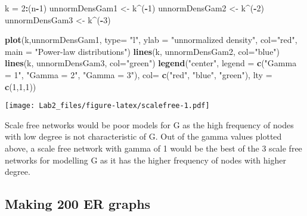 \documentclass[]{article}
\newenvironment{Shaded}{\begin{snugshade}}{\end{snugshade}}
\newcommand{\KeywordTok}[1]{\textcolor[rgb]{0.13,0.29,0.53}{\textbf{#1}}}
\newcommand{\DataTypeTok}[1]{\textcolor[rgb]{0.13,0.29,0.53}{#1}}
\newcommand{\DecValTok}[1]{\textcolor[rgb]{0.00,0.00,0.81}{#1}}
\newcommand{\StringTok}[1]{\textcolor[rgb]{0.31,0.60,0.02}{#1}}
\newcommand{\OperatorTok}[1]{\textcolor[rgb]{0.81,0.36,0.00}{\textbf{#1}}}
\newcommand{\NormalTok}[1]{#1}
\begin{document}
\begin{Shaded}
\begin{Highlighting}[]
\NormalTok{k =}\StringTok{ }\DecValTok{2}\OperatorTok{:}\NormalTok{(n}\OperatorTok{-}\DecValTok{1}\NormalTok{)}
\NormalTok{unnormDensGam1 <-}\StringTok{ }\NormalTok{k}\OperatorTok{^}\NormalTok{(}\OperatorTok{-}\DecValTok{1}\NormalTok{)}
\NormalTok{unnormDensGam2 <-}\StringTok{ }\NormalTok{k}\OperatorTok{^}\NormalTok{(}\OperatorTok{-}\DecValTok{2}\NormalTok{)}
\NormalTok{unnormDensGam3 <-}\StringTok{ }\NormalTok{k}\OperatorTok{^}\NormalTok{(}\OperatorTok{-}\DecValTok{3}\NormalTok{)}

\KeywordTok{plot}\NormalTok{(k,unnormDensGam1, }\DataTypeTok{type=} \StringTok{"l"}\NormalTok{, }\DataTypeTok{ylab =} \StringTok{"unnormalized density"}\NormalTok{, }\DataTypeTok{col=}\StringTok{"red"}\NormalTok{,}
     \DataTypeTok{main =} \StringTok{"Power-law distributions"}\NormalTok{)}
\KeywordTok{lines}\NormalTok{(k, unnormDensGam2, }\DataTypeTok{col=}\StringTok{"blue"}\NormalTok{)}
\KeywordTok{lines}\NormalTok{(k, unnormDensGam3, }\DataTypeTok{col=}\StringTok{"green"}\NormalTok{)}
\KeywordTok{legend}\NormalTok{(}\StringTok{"center"}\NormalTok{, }\DataTypeTok{legend =} \KeywordTok{c}\NormalTok{(}\StringTok{"Gamma = 1"}\NormalTok{, }\StringTok{"Gamma = 2"}\NormalTok{, }\StringTok{"Gamma = 3"}\NormalTok{), }\DataTypeTok{col=} \KeywordTok{c}\NormalTok{(}\StringTok{"red"}\NormalTok{, }\StringTok{"blue"}\NormalTok{, }\StringTok{"green"}\NormalTok{), }\DataTypeTok{lty =} \KeywordTok{c}\NormalTok{(}\DecValTok{1}\NormalTok{,}\DecValTok{1}\NormalTok{,}\DecValTok{1}\NormalTok{))}
\end{Highlighting}
\end{Shaded}

\texttt{[image: Lab2\_files/figure-latex/scalefree-1.pdf]}

Scale free networks would be poor models for G as the high frequency of
nodes with low degree is not characteristic of G. Out of the gamma
values plotted above, a scale free network with gamma of 1 would be the
best of the 3 scale free networks for modelling G as it has the higher
frequency of nodes with higher degree.

\subsection{Making 200 ER graphs}\label{making-200-er-graphs}
\end{document}
